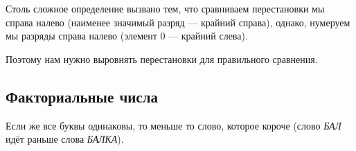 \documentclass[12pt,a4paper,oneside]{article}
\begin{document}
Столь сложное определение вызвано тем, что сравниваем перестановки мы справа налево
(наименее значимый разряд --- крайний справа), однако, нумеруем мы разряды справа налево
(элемент $0$ --- крайний слева). 

Поэтому нам нужно выровнять перестановки для правильного сравнения.

\subsection{Факториальные числа}

Если же все буквы одинаковы, то меньше то слово, которое короче (слово \emph{БАЛ} идёт раньше 
слова \emph{БАЛКА}). 
\end{document}
